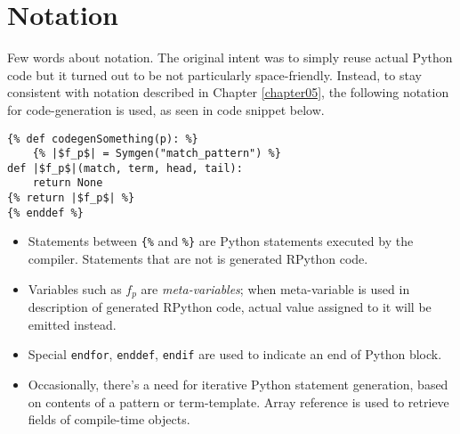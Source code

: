 \section{Notation}

Few words about notation. The original intent was to simply reuse actual Python code but it turned out to be not particularly space-friendly. Instead, to stay consistent with notation described in Chapter \ref{chapter05}, the following notation for code-generation is used, as seen in code snippet below.


\begin{verbatim}
{% def codegenSomething(p): %}
	{% |$f_p$| = Symgen("match_pattern") %}
def |$f_p$|(match, term, head, tail):
	return None
{% return |$f_p$| %}
{% enddef %}
\end{verbatim} 

\begin{itemize}
\item Statements between \texttt{\{\%} and \texttt{\%\}} are Python statements executed by the compiler. Statements that are not is generated RPython code.
\item Variables such as $f_p$ are \textit{meta-variables}; when meta-variable is used in description of generated RPython code, actual value assigned to it will be emitted instead. 
\item Special \texttt{endfor}, \texttt{enddef}, \texttt{endif} are used to indicate an end of Python block.
\item Occasionally, there's a need for iterative Python statement generation, based on contents of a pattern or term-template. Array reference is used to retrieve fields of compile-time objects.

\end{itemize}
